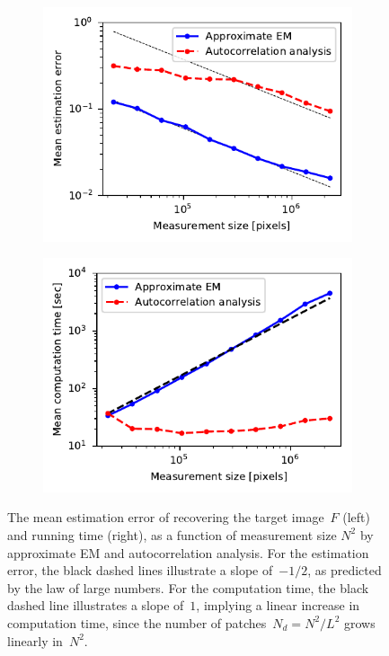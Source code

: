 \documentclass{article}
\begin{document}
\begin{figure}[!tb]
	\begin{subfigure}[ht]{.5\columnwidth}
		\centering
		\includegraphics[width=1\columnwidth]{figures/experiment_size_err.pdf}
	\end{subfigure}
	\begin{subfigure}[ht]{.5\columnwidth}
		\centering
		\includegraphics[width=1\columnwidth]{figures/experiment_size_time.pdf}
	\end{subfigure}
	\caption{The mean estimation error of recovering the target image~$F$ (left) and running time (right), as a function of measurement size $N^2$ by approximate EM and autocorrelation analysis. For the estimation error, the black dashed lines illustrate a slope of~$-1/2$, as predicted by the law of large numbers. For the computation time, the black dashed line illustrates a slope of~$1$, implying a linear increase in computation time, since the number of patches~\mbox{$N_d = N^2 / L^2$} grows linearly in~$N^2$.}
\label{fig:size_experiment}
\end{figure}
\end{document}
